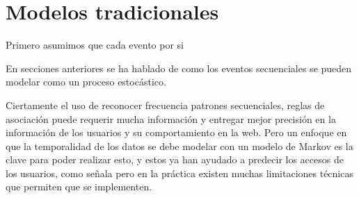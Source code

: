 \section{Modelos tradicionales}

%
Primero asumimos que cada evento por si 



En secciones anteriores se ha hablado de como los eventos secuenciales se pueden modelar como un proceso estocástico.

Ciertamente el uso de reconocer frecuencia patrones secuenciales, reglas de asociación puede requerir mucha  información y entregar mejor precisión en la información de los usuarios y su comportamiento en la web. Pero un enfoque en que la temporalidad de los datos se debe modelar con un modelo de Markov es la clave para poder realizar esto, y estos ya han ayudado a predecir los accesos de los usuarios, como señala %
pero en la práctica existen muchas limitaciones técnicas que permiten que se implementen. 

 






